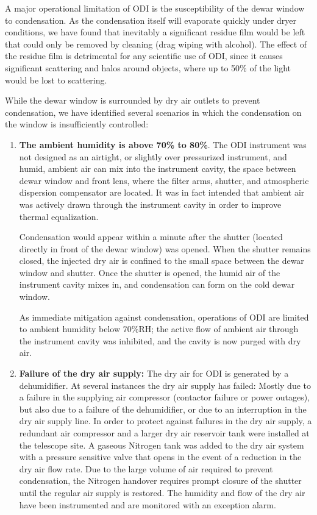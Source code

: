 \documentclass[]{spieman}
\begin{document}
A major operational limitation of ODI is the susceptibility of the dewar window
to condensation. As the condensation itself will evaporate quickly under dryer
conditions, we have found that inevitably a significant residue film would be
left that could only be removed by  cleaning (drag wiping with alcohol).
The effect of the residue film is detrimental for any scientific use of ODI,
since it causes significant scattering and halos around objects, where up to 
50\%  of the light would be lost to scattering.


While the dewar window is surrounded by dry air outlets to prevent condensation,
we have identified several scenarios in which the condensation  on the window is 
insufficiently controlled:

\begin{enumerate}

\item {\bf The ambient humidity is above 70\% to 80\%}. The ODI instrument was
not designed as an airtight, or slightly over pressurized instrument, and humid,
ambient air can mix into the instrument cavity, the space between dewar window
and front lens, where the filter arms, shutter, and atmospheric dispersion
compensator are located. It was in fact intended that ambient air was actively drawn
through	the instrument cavity in order to improve thermal equalization.

Condensation would  appear within a minute after the shutter (located directly
in front of the dewar window) was opened. When the shutter remains closed, the
injected dry air is confined to the small space between the dewar window and
shutter. Once the shutter is opened, the  humid air of the instrument cavity
mixes in, and condensation can form on the cold dewar window.

As immediate mitigation against condensation, operations of ODI are limited to
ambient humidity below 70\%RH; the active flow of ambient air through the
instrument cavity was inhibited, and the cavity is now purged with dry air.

\item {\bf Failure of the dry air supply:} The dry air for ODI is generated by a
dehumidifier. At several instances the dry air supply has failed: Mostly due to
a failure in the supplying air compressor (contactor failure or power outages),
but also due to a failure of the dehumidifier, or due to an interruption in the
dry air supply line. In order to protect against failures in the dry air supply,
a redundant air compressor and a larger dry air reservoir tank were installed at
the telescope site. A gaseous Nitrogen tank was added to the dry air system with 
a pressure sensitive valve that opens in the event of a reduction in the dry air
flow rate. Due to the large volume of air required to prevent condensation, 
the Nitrogen handover requires prompt closure of the shutter until the regular 
air supply is restored. The humidity and flow of the dry air have been instrumented
and are monitored with an exception alarm.


\end{enumerate}
\end{document}
